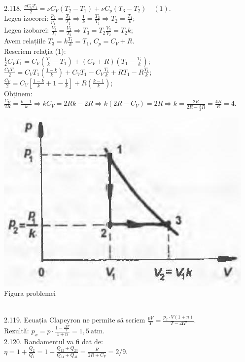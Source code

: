 2.118. $\frac{\nu C_{V} T_{1}}{2}=\nu C_{V}\left(T_{2}-T_{1}\right)+\nu C_{p}\left(T_{3}-T_{2}\right) \quad (1)$.\\ Legea izocorei: $\frac{p_{2}}{p_{1}}=\frac{T_{2}}{T_{1}} \Rightarrow \frac{1}{k}=\frac{T_{2}}{T_{1}} \Rightarrow T_{2}=\frac{T_{1}}{k}$;\\ Legea izobarei: $\frac{V_{3}}{T_{3}}=\frac{V_{2}}{T_{2}} \Rightarrow T_{3}=T_{2} \frac{V_{3}}{V_{2}}=T_{2} k$;\\ Avem relațiile $T_{3}=k \frac{T_{1}}{k}=T_{1}$, $C_{p}=C_{V}+R$.\\ Rescriem relaţia (1):\\ $\frac{1}{2} C_{V} T_{1}=C_{V}\left(\frac{T_{1}}{k}-T_{1}\right)+\left(C_{V}+R\right)\left(T_{1}-\frac{T_{1}}{k}\right)$;\\ $\frac{C_{V} T_{1}}{2}=C_{V} T_{1}\left(\frac{1-k}{k}\right)+C_{V} T_{1}-C_{V} \frac{T_{1}}{k}+R T_{1}-R \frac{T_{1}}{k}$;\\ $\frac{C_{V}}{2}=C_{V}\left[\frac{1-k}{k}+1-\frac{1}{k}\right]+R\left(\frac{k-1}{k}\right)$;\\ Obținem:\\ $\frac{C_{V}}{2 R}=\frac{k-1}{k} \Rightarrow k C_{V}=2 R k-2 R \Rightarrow k\left(2 R-C_{V}\right)=2 R \Rightarrow k=\frac{2 R}{2 R-\frac{3}{2} R}=\frac{4 R}{R}=4$.\\ \begin{center} \includegraphics[width=0.4\linewidth]{images/2025_07_01_5b3ff9fa0d508c8e9f17g-293}\\ Figura problemei \end{center}\\

2.119. Ecuația Clapeyron ne permite să scriem $\frac{p V}{T}=\frac{p_{x} \cdot V(1+n)}{T-\Delta T}$.\\ Rezultă: $p_{x}=p \cdot \frac{1-\frac{\Delta T}{T}}{1+n}=1,5 \mathrm{~atm}$.\\

2.120. Randamentul va fi dat de:\\ $\eta=1+\frac{Q_{2}}{Q_{1}}=1+\frac{Q_{12}+Q_{23}}{Q_{34}+Q_{41}}=\frac{R}{2 R+C_{V}}=2 / 9$.\\

